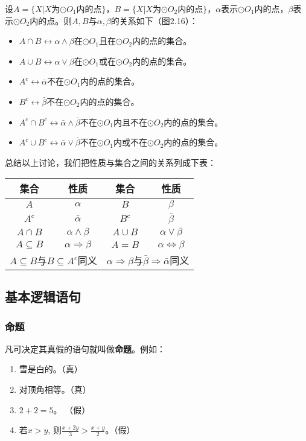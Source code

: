 设$A=\{X|X\text{为$\odot O_1$内的点}\}$，$B=\{X|X\text{为$\odot O_2$内的点}\}$，$\alpha$表示$\odot O_1$内的点，$\beta$表示$\odot O_2$内的点。则$A,B$与$\alpha,\beta$的关系如下（图2.16）：
\begin{itemize}
    \item $A\cap B \longleftrightarrow \alpha\wedge \beta$\quad 在$\odot O_1$且在$\odot O_2$内的点的集合。
    \item $A\cup B\longleftrightarrow \alpha\vee \beta$\quad 在$\odot O_1$或在$\odot O_2$内的点的集合。
    \item $A^c\longleftrightarrow \bar{\alpha}$\quad 不在$\odot O_1$内的点的集合。
    \item $B^c\longleftrightarrow \bar{\beta}$\quad 不在$\odot O_2$内的点的集合。
    \item $A^c\cap B^c\longleftrightarrow \bar\alpha\wedge\bar\beta $\quad 不在$\odot O_1$内且不在$\odot O_2$内的点的集合。
    \item $A^c\cup B^c\longleftrightarrow \bar\alpha\vee\bar\beta$\quad 不在$\odot O_1$内或不在$\odot O_2$内的点的集合。
\end{itemize}

总结以上讨论，我们把性质与集合之间的关系列成下表：
\begin{center}
    \begin{tabular}{cc|cc}
\hline
        集合  & 性质 &集合  &性质\\
\hline
$A$ & $\alpha$ & $B$ & $\beta$\\
$A^c$ & $\bar\alpha$ & $B^c$ & $\bar\beta$\\
$A\cap B$ & $\alpha\wedge \beta$ & $A\cup B$ & $\alpha\vee\beta$\\
$A\subseteq B$ & $\alpha\Rightarrow\beta $& $A=B$&$\alpha\Leftrightarrow \beta$\\
\multicolumn{2}{c|}{$A\subseteq B$与$B\subseteq A^c$同义}& \multicolumn{2}{|c}{$\alpha\Rightarrow\beta$与$\bar\beta\Rightarrow\bar\alpha$同义}\\
\hline
    \end{tabular}
\end{center}

\subsection{基本逻辑语句}
\subsubsection{命题}
凡可决定其真假的语句就叫做\textbf{命题}。例如：
\begin{enumerate}
    \item 雪是白的。（真）
    \item 对顶角相等。（真）
    \item $2+2=5$。 （假）
    \item 若$x>y$, 则$\frac{x+2y}{3}>\frac{x+y}{2}$。（假）
\end{enumerate}

